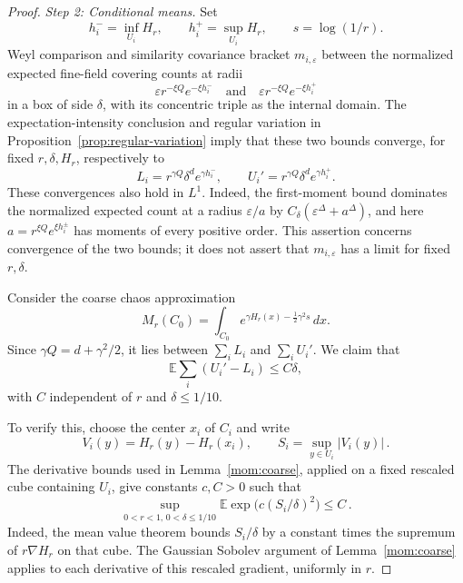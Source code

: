 \documentclass[11pt,letterpaper]{article}
\newcommand{\E}{\mathbb E}
\newcommand{\eps}{\varepsilon}
\theoremstyle{definition}
\theoremstyle{remark}
\numberwithin{equation}{section}
\begin{document}
\begin{proof}
\emph{Step 2: Conditional means.} Set
\begin{equation*}
 h_i^- =\inf_{U_i}H_r,\qquad h_i^+=\sup_{U_i}H_r,
 \qquad s=\log(1/r).
\end{equation*}
Weyl comparison and similarity covariance bracket $m_{i,\eps}$ between the normalized expected fine-field covering counts at radii
\begin{equation*}
 \eps r^{-\xi Q}e^{-\xi h_i^-}
 \quad\text{and}\quad
 \eps r^{-\xi Q}e^{-\xi h_i^+}
\end{equation*}
in a box of side $\delta$, with its concentric triple as the internal domain. The expectation-intensity conclusion and regular variation in Proposition~\ref{prop:regular-variation} imply that these two bounds converge, for fixed $r,\delta,H_r$, respectively to
\begin{equation}\label{eq:conditional-mean-brackets}
 L_i=r^{\gamma Q}\delta^d e^{\gamma h_i^-},
 \qquad U_i'=r^{\gamma Q}\delta^d e^{\gamma h_i^+}.
\end{equation}
These convergences also hold in $L^1$. Indeed, the first-moment bound dominates the normalized expected count at a radius $\eps/a$ by $C_\delta(\eps^\Delta+a^\Delta)$, and here $a=r^{\xi Q}e^{\xi h_i^\pm}$ has moments of every positive order. This assertion concerns convergence of the two bounds; it does not assert that $m_{i,\eps}$ has a limit for fixed $r,\delta$.

Consider the coarse chaos approximation
\begin{equation*}
 M_r(C_0)=\int_{C_0}
 e^{\gamma H_r(x)-\frac12\gamma^2s}\,dx.
\end{equation*}
Since $\gamma Q=d+\gamma^2/2$, it lies between $\sum_iL_i$ and $\sum_iU_i'$. We claim that
\begin{equation}\label{eq:coarse-oscillation-gap}
 \E\sum_i(U_i'-L_i)\le C\delta,
\end{equation}
with $C$ independent of $r$ and $\delta\le1/10$.

To verify this, choose the center $x_i$ of $C_i$ and write
\begin{equation*}
 V_i(y)=H_r(y)-H_r(x_i),\qquad
 S_i=\sup_{y\in U_i}|V_i(y)|\,.
\end{equation*}
The derivative bounds used in Lemma~\ref{mom:coarse}, applied on a fixed rescaled cube containing $U_i$, give constants $c,C>0$ such that
\begin{equation}\label{eq:small-oscillation-square}
 \sup_{0<r<1,\,0<\delta\le1/10}\E\exp\bigl(c(S_i/\delta)^2\bigr)\le C\,.
\end{equation}
Indeed, the mean value theorem bounds $S_i/\delta$ by a constant times the supremum of $r\nabla H_r$ on that cube. The Gaussian Sobolev argument of Lemma~\ref{mom:coarse} applies to each derivative of this rescaled gradient, uniformly in $r$.


\end{proof}
\end{document}

